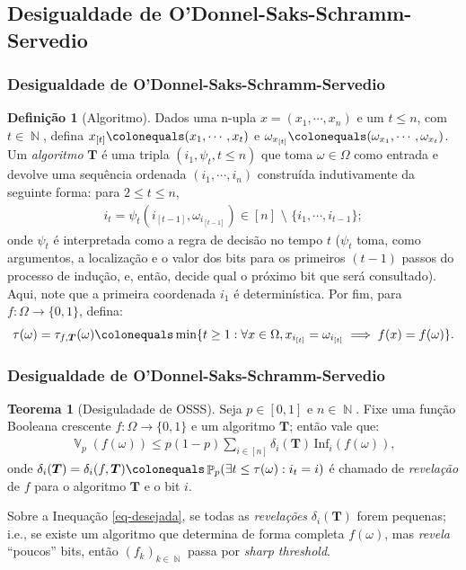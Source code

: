 \documentclass[12pt]{beamer}
\theoremstyle{definition} %
\newtheorem{mydef}{Definição}
\newtheorem{mythm}{Teorema}
\DeclareMathOperator{\PX}{\mathbb{P}} %
\DeclareMathOperator{\VX}{\mathbb{V}} %
\DeclareMathOperator{\NX}{\mathbb{N}} %
\newcommand{\infl}{\text{Inf}_i(f(\omega))}
\begin{document}
	
	\subsection{Desigualdade de O'Donnel-Saks-Schramm-Servedio}
	\begin{frame}[t]
		\frametitle{Desigualdade de O'Donnel-Saks-Schramm-Servedio}
		\vspace{-3.5pt}	
		\begin{mydef}[Algoritmo]
			{\footnotesize
				Dados uma n-upla $x = (x_1, \cdots, x_n)$ e um $t \leq n$, com $t \in \NX$, defina $x_{[t]} \colonequals (x_1, \cdots, x_t)$ e $\omega_{x_{[t]}} \colonequals (\omega_{x_1}, \cdots, \omega_{x_t})$. Um \textit{algoritmo} $\boldsymbol{T}$ é uma tripla $(i_1, \psi_t, t \leq n)$ que toma $\omega \in \Omega$ como entrada e devolve uma sequência ordenada $(i_1, \cdots, i_n)$ construída indutivamente da seguinte forma: para $2 \leq t \leq n$,
				\begin{align*}
					i_t = \psi_t(i_{[t-1]}, \omega_{i_{[t-1]}}) \in [n] \text{~\textbackslash~} \{i_1, \cdots, i_{t-1}\};
				\end{align*}
				onde $\psi_t$ é interpretada como a regra de decisão no tempo $t$ ($\psi_t$ toma, como argumentos, a localização e o valor dos bits para os primeiros $(t-1)$ passos do processo de indução, e, então, decide qual o próximo bit que será consultado). Aqui, note que a primeira coordenada $i_1$ é determinística. Por fim, para $f:\Omega \longrightarrow \{0,1\}$, defina:
				\vspace{-6pt}
				\begin{align*}
					\tau(\omega) = \tau_{f, \boldsymbol{T}}(\omega) \colonequals \min\{t \geq 1: \forall x \in \Omega, x_{i_{[t]}} = \omega_{i_{[t]}} \implies f(x) = f(\omega)\}.
				\end{align*}
				\vspace{-24pt}
			}
		\end{mydef}
	\end{frame}

	\begin{frame}[t]
		\frametitle{Desigualdade de O'Donnel-Saks-Schramm-Servedio}	
		\begin{mythm}[Desiguladade de OSSS]
			Seja $p \in [0,1]$ e $n \in \NX$. Fixe uma função Booleana crescente $f: \Omega \longrightarrow \{0,1\}$ e um algoritmo $\boldsymbol{T}$; então vale que:
			\begin{align*}
				\VX_p(f(\omega)) \leq p(1 - p) \sum_{i \in [n]} \delta_i(\boldsymbol{T}) \, \infl, 
			\end{align*}
			onde $\delta_i(\boldsymbol{T}) = \delta_i(f, \boldsymbol{T}) \colonequals \PX_p(\exists t \leq \tau(\omega) : i_t = i)$ é chamado de \textit{revelação} de $f$ para o algoritmo $\boldsymbol{T}$ e o bit $i$.
			\label{osss-inequality}
		\end{mythm}
		\pause
		\vspace{-8pt}
		Sobre a Inequação \ref{eq-desejada}, se todas as \textit{revelações} $\delta_i(\boldsymbol{T})$ forem pequenas; i.e., se existe um algoritmo que determina de forma completa $f(\omega)$, mas \textit{revela} ``poucos'' bits, então $(f_k)_{k \in \NX}$ passa por \textit{sharp threshold}.
	\end{frame}
\end{document}

